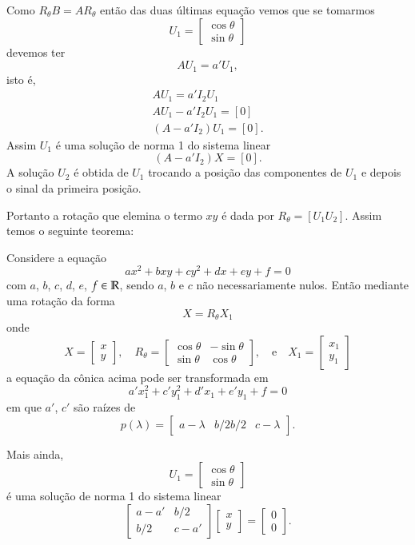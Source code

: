 Como $R_\theta B = AR_\theta$ então das duas últimas equação vemos que se tomarmos
\[
  U_1 = \begin{bmatrix}
    \cos\theta\\
    \sin\theta
  \end{bmatrix}
\]
devemos ter
\[
  AU_1 = a'U_1,
\]
isto é,
\begin{align*}
  AU_1 = a'I_2 U_1\\
  AU_1 - a'I_2 U_1 = [0]\\
  (A - a'I_2)U_1 = [0].
\end{align*}
Assim $U_1$ é uma solução de norma 1 do sistema linear
\[
  (A - a'I_2)X = [0].
\]
A solução $U_2$ é obtida de $U_1$ trocando a posição das componentes de $U_1$ e depois o sinal da primeira posição.

Portanto a rotação que elemina o termo $xy$ é dada por $R_\theta = [U_1 U_2]$. Assim temos o seguinte teorema:

\begin{teorema}
  Considere a equação
  \[
      ax^2 + bxy + cy^2 + dx + ey + f = 0
  \]
  com $a$, $b$, $c$, $d$, $e$, $f \in \mathbb{R}$, sendo $a$, $b$ e $c$ não necessariamente nulos. Então mediante uma rotação da forma
  \[
    X = R_\theta X_1
  \]
  onde
  \[
    X = \begin{bmatrix}
      x\\y
    \end{bmatrix}, \quad
    R_\theta = \begin{bmatrix}
    \cos\theta & -\sin\theta\\
    \sin\theta & \cos\theta
  \end{bmatrix}, \quad\mbox{e}\quad
  X_1 = \begin{bmatrix}
    x_1\\y_1
  \end{bmatrix}
  \]
  a equação da cônica acima pode ser transformada em
  \[
    a'x_1^2 + c'y_1^2 + d'x_1 + e'y_1 + f = 0
  \]
  em que $a'$, $c'$ são raízes de
  \[
    p(\lambda) = \begin{bmatrix}
      a - \lambda & b/2
      b/2 & c - \lambda
    \end{bmatrix}.
  \]

  Mais ainda,
  \[
    U_1 = \begin{bmatrix}
      \cos\theta\\ \sin\theta
    \end{bmatrix}
  \]
  é uma solução de norma 1 do sistema linear
  \[
    \begin{bmatrix}
      a - a' & b/2\\
      b/2 & c - a'
    \end{bmatrix} \begin{bmatrix}
      x\\y
    \end{bmatrix} = \begin{bmatrix}
      0\\0
    \end{bmatrix}.
  \]
\end{teorema}

